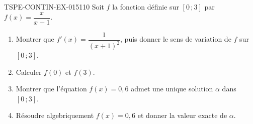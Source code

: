 \begin{exercice}{TSPE-CONTIN-EX-015}{1}{10}
Soit $f$ la fonction définie sur $[0\,;3]$ par $f(x) = \dfrac{x}{x+1}$.
\begin{enumerate}
  \item Montrer que $f'(x) = \dfrac{1}{(x+1)^2}$, puis donner le sens de variation de $f$ sur $[0\,;3]$.
  \item Calculer $f(0)$ et $f(3)$.
  \item Montrer que l'équation $f(x) = 0{,}6$ admet une unique solution $\alpha$ dans $[0\,;3]$.
  \item Résoudre algebriquement $f(x) = 0{,}6$ et donner la valeur exacte de $\alpha$.
\end{enumerate}
\end{exercice}
